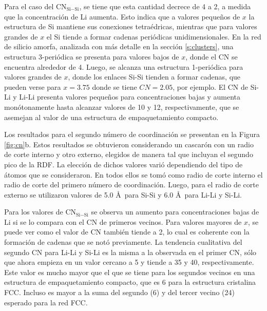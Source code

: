 Para el caso del CN$_{\text{Si}-\text{Si}}$, se tiene que esta cantidad decrece de 4 a 2, a 
medida que la concentración de Li aumenta. Esto indica que a valores pequeños de 
$x$ la estructura de Si mantiene sus conexiones tetraédricas, mientras que para
valores grandes de $x$ el Si tiende a formar cadenas periódicas unidimensionales.
En la red de silicio amorfa, analizada con más detalle en la sección 
\ref{s:clusters}, una estructura 3-periódica se presenta para valores bajos de 
$x$, donde el CN se encuentra alrededor de 4. Luego, se alcanza una estructura 1-periódica 
para valores grandes de $x$, donde los enlaces Si-Si tienden a formar 
cadenas, que pueden verse para $x = 3.75$ donde se tiene $CN = 2.05$, por ejemplo.
El CN de Si-Li y Li-Li presenta valores pequeños para concentraciones 
bajas y aumenta monótonamente hasta alcanzar valores de 10 y 12, respectivamente, 
que se asemejan al valor de una estructura de empaquetamiento compacto.

Los resultados para el segundo número de coordinación se presentan en la Figura 
\ref{fig:cn}b. Estos resultados se obtuvieron considerando un cascarón con un 
radio de corte interno y otro externo, elegidos de manera tal que incluyan el 
segundo pico de la RDF. La elección de dichos valores varió dependiendo del tipo
de átomos que se consideraron. En todos ellos se tomó como radio de corte interno 
el radio de corte del primero número de coordinación. Luego, para el radio de 
corte externo se utilizaron valores de 5.0 \AA\ para Si-Si y 6.0 \AA\ para Li-Li
y Si-Li.

Para los valores de CN$_{\text{Si}-\text{Si}}$ se observa un aumento para concentraciones bajas
de Li si se lo compara con el CN de primeros vecinos. Para valores mayores de $x$,
se puede ver como el valor de CN también tiende a 2, lo cual es coherente con la
formación de cadenas que se notó previamente. La tendencia cualitativa del segundo
CN para Li-Li y Si-Li es la misma a la observada en el primer CN, sólo que ahora
empieza en un valor cercano a 5 y tiende a 35 y 40, respectivamente. Este valor 
es mucho mayor que el que se tiene para los segundos vecinos en una estructura 
de empaquetamiento compacto, que es 6 para la estructura cristalina FCC. Incluso 
es mayor a la suma del segundo (6) y del tercer vecino (24) esperado para la red 
FCC.

